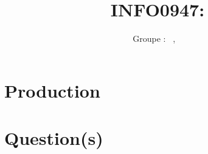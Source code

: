 \documentclass[a4paper, 11pt, oneside]{article}
\title{INFO0947: \intitule}
\author{Groupe \GrNbr : \PrenomUN~\textsc{\NomUN}, \PrenomDEUX~\textsc{\NomDEUX}}
\date{}
\begin{document}
\maketitle




\section{Production}



\section{Question(s)}

\end{document}
